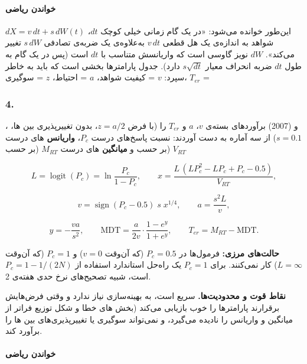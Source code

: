\paragraph{خواندن ریاضی}

\(dX = v\,dt + s\,dW(t)\) این‌طور خوانده می‌شود: «در یک گام زمانی خیلی
کوچک \(dt\)، شواهد به اندازه‌ی یک هل قطعی \(v\,dt\) به‌علاوه‌ی یک ضربه‌ی
تصادفی \(s\,dW\) تغییر می‌کند». \(dW\) نویز گاوسی است که واریانسش متناسب
با \(dt\) است (پس در یک گام به طول \(dt\) ضربه انحراف معیار
\(s\sqrt{dt}\) دارد). جدول پارامترها بخشی است که باید به خاطر سپرد:
\(v\) = کیفیت شواهد، \(a\) = احتیاط، \(z\) = سوگیری، \(T_{er}\) =

\subsubsection{\texorpdfstring{4. }{4. EZ-diffusion}}

،  و  (2007) برآوردهای
بسته‌ی \(v\)، \(a\) و \(T_{er}\) را (با فرض \(z = a/2\)، بدون تغییرپذیری
بین ها، \(s = 0.1\)) از سه آماره به دست آوردند: نسبت پاسخ‌های
درست \(P_c\)، \textbf{واریانس} های درست \(V_{RT}\) (بر حسب
 و \textbf{میانگین} های درست \(M_{RT}\) (بر حسب 

\[
L = \operatorname{logit}(P_c) = \ln\frac{P_c}{1 - P_c}, \qquad
x = \frac{L\,(L P_c^2 - L P_c + P_c - 0.5)}{V_{RT}},
\]

\[
v = \operatorname{sign}(P_c - 0.5)\; s\; x^{1/4}, \qquad
a = \frac{s^2 L}{v},
\]

\[
y = -\frac{v a}{s^2}, \qquad
\mathrm{MDT} = \frac{a}{2v}\cdot\frac{1 - e^{y}}{1 + e^{y}}, \qquad
T_{er} = M_{RT} - \mathrm{MDT}.
\]

\textbf{حالت‌های مرزی:} فرمول‌ها در \(P_c = 0.5\) (که آن‌وقت \(v = 0\)) و
\(P_c = 1\) (که آن‌وقت \(L = \infty\)) کار نمی‌کنند. برای \(P_c = 1\) یک
راه‌حل استاندارد استفاده از \(P_c = 1 - 1/(2N)\) است، شبیه تصحیح‌های نرخ
حدی هفته‌ی 2.

\textbf{نقاط قوت و محدودیت‌ها.}  سریع است، به بهینه‌سازی نیاز ندارد
و وقتی فرض‌هایش برقرارند پارامترها را خوب بازیابی می‌کند (بخش های خطا و شکل توزیع  فراتر از میانگین و واریانس را نادیده
می‌گیرد، و نمی‌تواند سوگیری یا تغییرپذیری‌های بین ها را برآورد
کند.

\paragraph{خواندن ریاضی}


